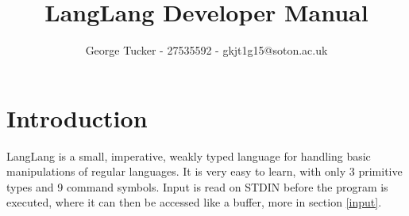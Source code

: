 \documentclass{article}
\title{LangLang Developer Manual}
\author{George Tucker - 27535592 - gkjt1g15@soton.ac.uk}
\begin{document}
\maketitle

\section{Introduction}
\begin{normalsize}
LangLang is a small, imperative, weakly typed language for handling basic manipulations of regular languages. It is very easy to learn, with only 3 primitive types and 9 command symbols. Input is read on STDIN before the program is executed, where it can then be accessed like a buffer, more in section \ref{input}.
\end{normalsize}





\end{document}
